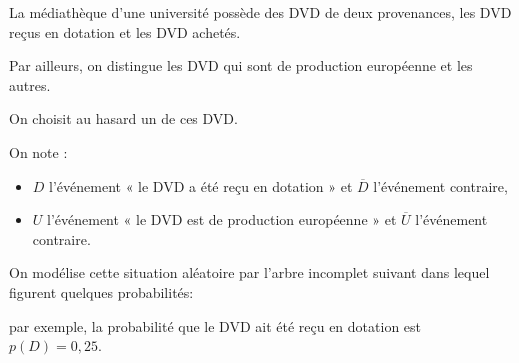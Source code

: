 
%
La médiathèque d'une université possède des DVD de deux provenances, les DVD reçus en dotation et les DVD achetés.
\par
Par ailleurs, on distingue les DVD qui sont de production européenne et les autres.
\par
On choisit au hasard un de ces DVD.
\par
On note :
\begin{itemize}
     \item
     $D$ l'événement « le DVD a été reçu en dotation » et $\overline{D}$ l'événement contraire,
     \item
     $U$ l'événement « le DVD est de production européenne » et $\overline{U}$ l'événement contraire.
\end{itemize}
On modélise cette situation aléatoire par l'arbre incomplet suivant dans lequel figurent quelques probabilités:
\begin{center}
 \begin{extern}%
   \end{extern}
\end{center}
par exemple, la probabilité que le DVD ait été reçu en dotation est $p\left(D\right)=0,25$.
